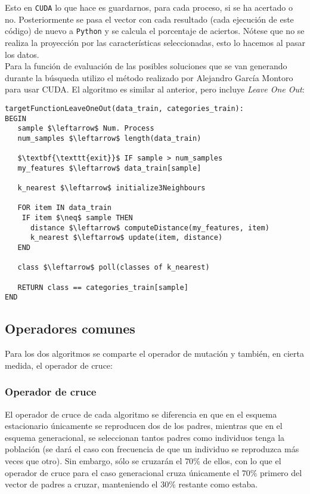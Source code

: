 \documentclass[11pt,leqno]{article}
\begin{document}
	Esto en \texttt{CUDA} lo que hace es guardarnos, para cada proceso, si se ha acertado o no. Posteriormente se pasa el vector con cada resultado (cada ejecución de este código) de nuevo a \texttt{Python} y se calcula el porcentaje de aciertos. Nótese que no se realiza la proyección por las características seleccionadas, esto lo hacemos al pasar los datos.\\
	Para la función de evaluación de las posibles soluciones que se van generando durante la búsqueda utilizo el método realizado por Alejandro García Montoro para usar CUDA. El algoritmo es similar al anterior, pero incluye \textit{Leave One Out}:

\newpage
\begin{lstlisting}[mathescape=true]
targetFunctionLeaveOneOut(data_train, categories_train):
BEGIN
   sample $\leftarrow$ Num. Process
   num_samples $\leftarrow$ length(data_train)
   
   $\textbf{\texttt{exit}}$ IF sample > num_samples
   my_features $\leftarrow$ data_train[sample]
   
   k_nearest $\leftarrow$ initialize3Neighbours
	
   FOR item IN data_train
    IF item $\neq$ sample THEN
      distance $\leftarrow$ computeDistance(my_features, item)
      k_nearest $\leftarrow$ update(item, distance)
   END
	
   class $\leftarrow$ poll(classes of k_nearest)
      
   RETURN class == categories_train[sample]
END
\end{lstlisting}

\subsection{Operadores comunes}
	
	Para los dos algoritmos se comparte el operador de mutación y también, en cierta medida, el operador de cruce:
	
\subsubsection{Operador de cruce}

	El operador de cruce de cada algoritmo se diferencia en que en el esquema estacionario únicamente se reproducen dos de los padres, mientras que en el esquema generacional, se seleccionan tantos padres como individuos tenga la población (se dará el caso con frecuencia de que un individuo se reproduzca más veces que otro). Sin embargo, sólo se cruzarán el $70\%$ de ellos, con lo que el operador de cruce para el caso generacional cruza únicamente el $70\%$ primero del vector de padres a cruzar, manteniendo el $30\%$ restante como estaba. 
\end{document}
